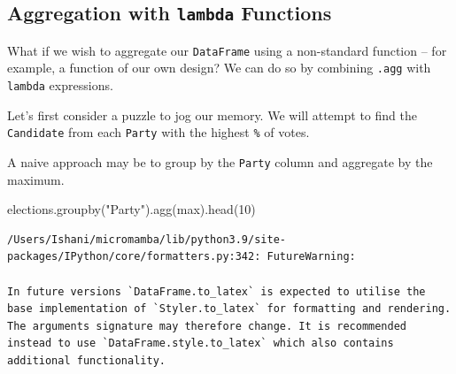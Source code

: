 \documentclass[
  letterpaper,
  DIV=11,
  numbers=noendperiod]{scrreprt}
\newenvironment{Shaded}{\begin{snugshade}}{\end{snugshade}}
\newcommand{\BuiltInTok}[1]{\textcolor[rgb]{0.00,0.23,0.31}{#1}}
\newcommand{\DecValTok}[1]{\textcolor[rgb]{0.68,0.00,0.00}{#1}}
\newcommand{\NormalTok}[1]{\textcolor[rgb]{0.00,0.23,0.31}{#1}}
\newcommand{\StringTok}[1]{\textcolor[rgb]{0.13,0.47,0.30}{#1}}
\begin{document}
\hypertarget{aggregation-with-lambda-functions}{%
\subsection{\texorpdfstring{Aggregation with \texttt{lambda}
Functions}{Aggregation with lambda Functions}}\label{aggregation-with-lambda-functions}}

What if we wish to aggregate our \texttt{DataFrame} using a non-standard
function -- for example, a function of our own design? We can do so by
combining \texttt{.agg} with \texttt{lambda} expressions.

Let's first consider a puzzle to jog our memory. We will attempt to find
the \texttt{Candidate} from each \texttt{Party} with the highest
\texttt{\%} of votes.

A naive approach may be to group by the \texttt{Party} column and
aggregate by the maximum.

\begin{Shaded}
\begin{Highlighting}[]
\NormalTok{elections.groupby(}\StringTok{"Party"}\NormalTok{).agg(}\BuiltInTok{max}\NormalTok{).head(}\DecValTok{10}\NormalTok{)}
\end{Highlighting}
\end{Shaded}

\begin{verbatim}
/Users/Ishani/micromamba/lib/python3.9/site-packages/IPython/core/formatters.py:342: FutureWarning:

In future versions `DataFrame.to_latex` is expected to utilise the base implementation of `Styler.to_latex` for formatting and rendering. The arguments signature may therefore change. It is recommended instead to use `DataFrame.style.to_latex` which also contains additional functionality.
\end{verbatim}
\end{document}
